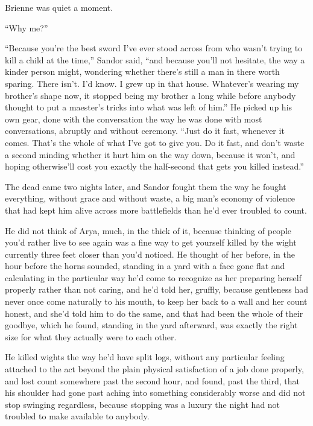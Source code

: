 Brienne was quiet a moment.

“Why me?”

“Because you’re the best sword I’ve ever stood across from who wasn’t trying to kill a child at the time,” Sandor said, “and because you’ll not hesitate, the way a kinder person might, wondering whether there’s still a man in there worth sparing. There isn’t. I’d know. I grew up in that house. Whatever’s wearing my brother’s shape now, it stopped being my brother a long while before anybody thought to put a maester’s tricks into what was left of him.” He picked up his own gear, done with the conversation the way he was done with most conversations, abruptly and without ceremony. “Just do it fast, whenever it comes. That’s the whole of what I’ve got to give you. Do it fast, and don’t waste a second minding whether it hurt him on the way down, because it won’t, and hoping otherwise’ll cost you exactly the half-second that gets you killed instead.”

\sceneBreak

The dead came two nights later, and Sandor fought them the way he fought everything, without grace and without waste, a big man’s economy of violence that had kept him alive across more battlefields than he’d ever troubled to count.

He did not think of Arya, much, in the thick of it, because thinking of people you’d rather live to see again was a fine way to get yourself killed by the wight currently three feet closer than you’d noticed. He thought of her before, in the hour before the horns sounded, standing in a yard with a face gone flat and calculating in the particular way he’d come to recognize as her preparing herself properly rather than not caring, and he’d told her, gruffly, because gentleness had never once come naturally to his mouth, to keep her back to a wall and her count honest, and she’d told him to do the same, and that had been the whole of their goodbye, which he found, standing in the yard afterward, was exactly the right size for what they actually were to each other.

He killed wights the way he’d have split logs, without any particular feeling attached to the act beyond the plain physical satisfaction of a job done properly, and lost count somewhere past the second hour, and found, past the third, that his shoulder had gone past aching into something considerably worse and did not stop swinging regardless, because stopping was a luxury the night had not troubled to make available to anybody.

